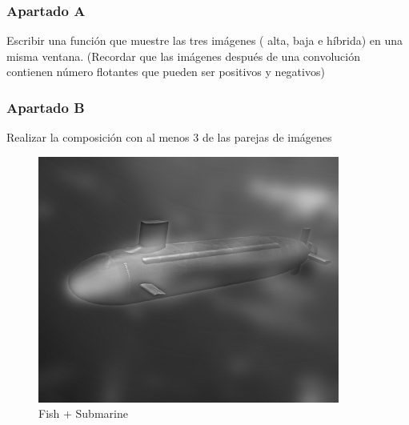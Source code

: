 \documentclass{article}
\begin{document}
\subsubsection{Apartado A} Escribir una función que muestre las tres imágenes ( alta, baja e híbrida) en una misma ventana. (Recordar que las imágenes después de una convolución contienen número flotantes que pueden ser positivos y negativos)
\subsubsection{Apartado B} Realizar la composición con al menos 3 de las parejas de
imágenes

\begin{minipage}{\linewidth}
    \centering
    \begin{minipage}{0.45\linewidth}
        \begin{figure}[H]
			\includegraphics[width=\linewidth]{Ejercicio3/hybrid1.png}          
			\caption{Fish + Submarine}
        \end{figure}
    \end{minipage}
    \hspace{0.05\linewidth}
    \begin{minipage}{0.45\linewidth}
        \begin{figure}[H]

\end{figure}
\end{minipage}
\end{minipage}
\end{document}
